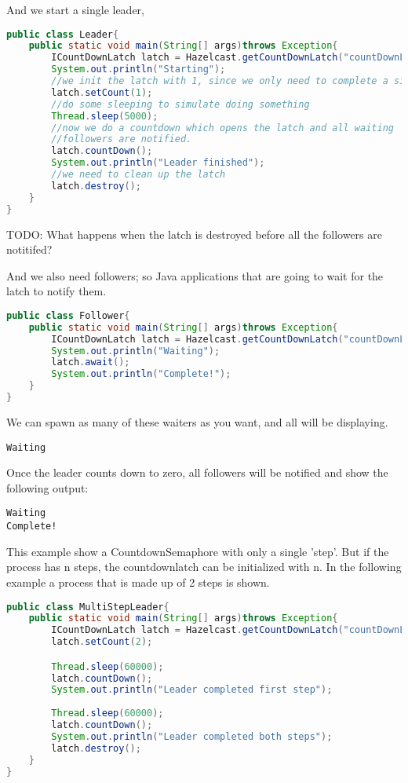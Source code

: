 And we start a single leader, 
\begin{lstlisting}[language=java]
public class Leader{
    public static void main(String[] args)throws Exception{
        ICountDownLatch latch = Hazelcast.getCountDownLatch("countDownLatch");
        System.out.println("Starting");
        //we init the latch with 1, since we only need to complete a single step.
        latch.setCount(1); 
        //do some sleeping to simulate doing something    
        Thread.sleep(5000);
        //now we do a countdown which opens the latch and all waiting
        //followers are notified.
        latch.countDown();
        System.out.println("Leader finished");
        //we need to clean up the latch
        latch.destroy();
    }
}
\end{lstlisting}

TODO: What happens when the latch is destroyed before all the followers are notitifed?

And we also need followers; so Java applications that are going to wait for the latch to notify them.

\begin{lstlisting}[language=java]
public class Follower{
    public static void main(String[] args)throws Exception{
        ICountDownLatch latch = Hazelcast.getCountDownLatch("countDownLatch");
        System.out.println("Waiting");
        latch.await();
        System.out.println("Complete!");
    }
}
\end{lstlisting}
We can spawn as many of these waiters as you want, and all will be displaying.

\begin{verbatim}
Waiting
\end{verbatim}

Once the leader counts down to zero, all followers will be notified and show the following output:

\begin{verbatim}
Waiting
Complete!
\end{verbatim}

This example show a CountdownSemaphore with only a single 'step'. But if the process has n steps, the countdownlatch can be initialized with n. In the following example a process that is made up of 2 steps is shown.

\begin{lstlisting}[language=java]
public class MultiStepLeader{
    public static void main(String[] args)throws Exception{
        ICountDownLatch latch = Hazelcast.getCountDownLatch("countDownLatch");
        latch.setCount(2);

        Thread.sleep(60000); 
        latch.countDown();
        System.out.println("Leader completed first step");
        
        Thread.sleep(60000); 
        latch.countDown();
        System.out.println("Leader completed both steps");
        latch.destroy();
    }
}
\end{lstlisting}

